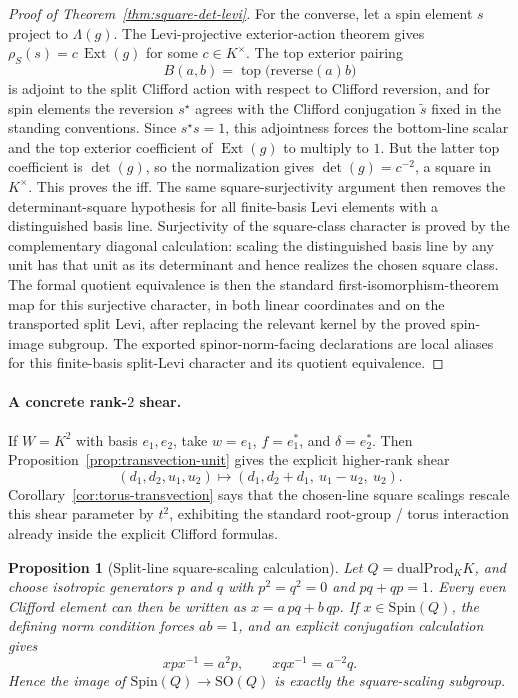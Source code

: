 \documentclass{birkjour}
\theoremstyle{plain}
\newtheorem{proposition}[theorem]{Proposition}
\theoremstyle{definition}
\theoremstyle{remark}
\newcommand{\Spin}{\mathrm{Spin}}
\newcommand{\SO}{\mathrm{SO}}
\newcommand{\dualProd}{\mathrm{dualProd}}
\newcommand{\ExtMap}{\operatorname{Ext}}
\begin{document}
\begin{proof}[Proof of Theorem~{}\ref{thm:square-det-levi}]
For the converse, let a spin element \(s\) project to \(\Lambda(g)\). The
Levi-projective exterior-action theorem gives
\(\rho_S(s)=c\,\ExtMap(g)\) for some \(c\in K^\times\). The top exterior
pairing
\[
  B(a,b)=\operatorname{top}\bigl(\mathrm{reverse}(a)b\bigr)
\]
is adjoint to the split Clifford action with respect to Clifford reversion, and
for spin elements the reversion \(s^\star\) agrees with the Clifford
conjugation \(\tilde s\) fixed in the standing conventions. Since \(s^\star s=1\),
this adjointness forces the bottom-line scalar and the top exterior coefficient
of \(\ExtMap(g)\) to multiply to \(1\). But the latter top coefficient is
\(\det(g)\), so the normalization gives \(\det(g)=c^{-2}\), a square in
\(K^\times\). This proves the iff. The same square-surjectivity argument then
removes the determinant-square hypothesis for all finite-basis Levi elements
with a distinguished basis line. Surjectivity of the square-class character is
proved by the complementary diagonal calculation: scaling the distinguished
basis line by any unit has that unit as its determinant and hence realizes the
chosen square class. The formal quotient equivalence is then the standard
first-isomorphism-theorem map for this surjective character, in both linear coordinates and on
the transported split Levi, after replacing the relevant kernel by the proved spin-image subgroup.
The exported spinor-norm-facing declarations are local aliases for this
finite-basis split-Levi character and its quotient equivalence.
\end{proof}

\paragraph{A concrete rank-$2$ shear.}
If $W=K^2$ with basis $e_1,e_2$, take $w=e_1$, $f=e_1^*$, and
$\delta=e_2^*$. Then Proposition~{}\ref{prop:transvection-unit} gives the
explicit higher-rank shear
\[
  (d_1,d_2,u_1,u_2)\longmapsto (d_1,d_2+d_1,\ u_1-u_2,\ u_2).
\]
Corollary~{}\ref{cor:torus-transvection} says that the chosen-line square
scalings rescale this shear parameter by $t^2$, exhibiting the standard
root-group / torus interaction already inside the explicit Clifford formulas.

\begin{proposition}[Split-line square-scaling calculation]
\label{prop:split-line-square}
Let $Q=\dualProd_K K$, and choose isotropic generators $p$ and $q$ with
\(p^2=q^2=0\) and \(pq+qp=1\). Every even Clifford element can then be written
as \(x=a\,pq+b\,qp\). If \(x\in \Spin(Q)\), the defining norm condition forces
\(ab=1\), and an explicit conjugation calculation gives
\[
  x p x^{-1}=a^2 p,
  \qquad
  x q x^{-1}=a^{-2} q.
\]
Hence the image of $\Spin(Q)\to \SO(Q)$ is exactly the square-scaling subgroup.
\end{proposition}
\end{document}
